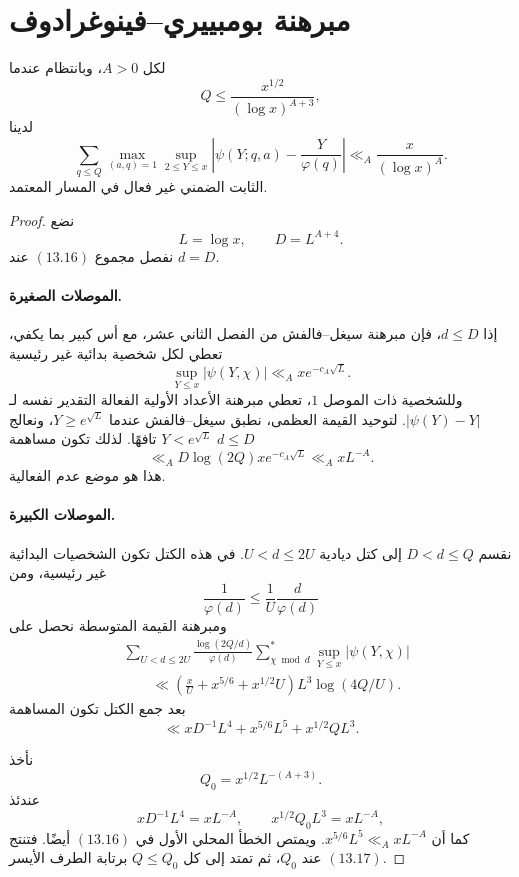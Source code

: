 \section{مبرهنة بومبييري--فينوغرادوف}

\begin{theorem}
\label{thm:chapter13-bombieri-vinogradov}
\provedhere
لكل \(A>0\)، وبانتظام عندما
\[
Q\le\frac{x^{1/2}}{(\log x)^{A+3}},
\]
لدينا
\[
\sum_{q\le Q}
\max_{(a,q)=1}
\sup_{2\le Y\le x}
\left|
\psi(Y;q,a)-\frac{Y}{\varphi(q)}
\right|
\ll_A
\frac{x}{(\log x)^A}.
\tag{13.17}
\]
الثابت الضمني غير فعال في المسار المعتمد.
\end{theorem}

\begin{proof}
نضع
\[
L=\log x,
\qquad
D=L^{A+4}.
\]
نفصل مجموع \((13.16)\) عند \(d=D\).

\paragraph{الموصلات الصغيرة.}
إذا \(d\le D\)، فإن مبرهنة سيغل--فالفش من الفصل الثاني عشر، مع أس
كبير بما يكفي، تعطي لكل شخصية بدائية غير رئيسية
\[
\sup_{Y\le x}|\psi(Y,\chi)|
\ll_A xe^{-c_A\sqrt L}.
\tag{13.18}
\]
وللشخصية ذات الموصل \(1\)، تعطي مبرهنة الأعداد الأولية الفعالة التقدير
نفسه لـ\(|\psi(Y)-Y|\). لتوحيد القيمة العظمى، نطبق سيغل--فالفش عندما
\(Y\ge e^{\sqrt L}\)، ونعالج \(Y<e^{\sqrt L}\) تافهًا. لذلك تكون مساهمة
\(d\le D\)
\[
\ll_A D\log(2Q)xe^{-c_A\sqrt L}
\ll_A xL^{-A}.
\tag{13.19}
\]
هذا هو موضع عدم الفعالية.

\paragraph{الموصلات الكبيرة.}
نقسم \(D<d\le Q\) إلى كتل ديادية \(U<d\le2U\). في هذه الكتل تكون
الشخصيات البدائية غير رئيسية، ومن
\[
\frac1{\varphi(d)}
\le
\frac1U\frac d{\varphi(d)}
\]
ومبرهنة القيمة المتوسطة نحصل على
\begin{align*}
&\sum_{U<d\le2U}
\frac{\log(2Q/d)}{\varphi(d)}
\sum_{\chi\bmod d}^{*}
\sup_{Y\le x}|\psi(Y,\chi)|\\
&\qquad\ll
\left(
\frac xU+x^{5/6}+x^{1/2}U
\right)L^3\log(4Q/U).
\end{align*}
بعد جمع الكتل تكون المساهمة
\[
\ll
xD^{-1}L^4+x^{5/6}L^5+x^{1/2}QL^3.
\tag{13.20}
\]

نأخذ
\[
Q_0=x^{1/2}L^{-(A+3)}.
\]
عندئذ
\[
xD^{-1}L^4=xL^{-A},
\qquad
x^{1/2}Q_0L^3=xL^{-A},
\]
كما أن \(x^{5/6}L^5\ll_A xL^{-A}\). ويمتص الخطأ المحلي الأول في
\((13.16)\) أيضًا. فتنتج \((13.17)\) عند \(Q_0\)، ثم تمتد إلى كل
\(Q\le Q_0\) برتابة الطرف الأيسر.
\end{proof}

